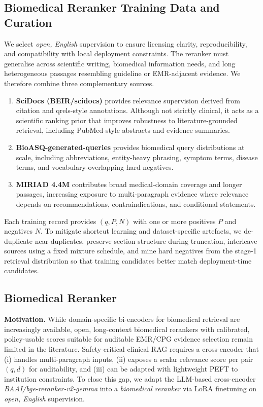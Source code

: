 \documentclass[conference]{IEEEtran}
\begin{document}
\subsection{Biomedical Reranker Training Data and Curation}
\label{app:reranker-data-curation}

We select \emph{open, English} supervision to ensure licensing clarity, reproducibility, and compatibility with local deployment constraints. The reranker must generalise across scientific writing, biomedical information needs, and long heterogeneous passages resembling guideline or EMR-adjacent evidence. We therefore combine three complementary sources.

\begin{enumerate}
    \item \textbf{SciDocs (BEIR/scidocs)} provides relevance supervision derived from citation and qrels-style annotations. Although not strictly clinical, it acts as a scientific ranking prior that improves robustness to literature-grounded retrieval, including PubMed-style abstracts and evidence summaries.
    \item \textbf{BioASQ-generated-queries} provides biomedical query distributions at scale, including abbreviations, entity-heavy phrasing, symptom terms, disease terms, and vocabulary-overlapping hard negatives.
    \item \textbf{MIRIAD 4.4M} contributes broad medical-domain coverage and longer passages, increasing exposure to multi-paragraph evidence where relevance depends on recommendations, contraindications, and conditional statements.
\end{enumerate}

Each training record provides $(q,P,N)$ with one or more positives $P$ and negatives $N$. To mitigate shortcut learning and dataset-specific artefacts, we de-duplicate near-duplicates, preserve section structure during truncation, interleave sources using a fixed mixture schedule, and mine hard negatives from the stage-1 retrieval distribution so that training candidates better match deployment-time candidates.

\subsection{Biomedical Reranker}
\label{subsec:biomedical-reranker}

\textbf{Motivation.}
While domain-specific bi-encoders for biomedical retrieval are increasingly available, open, long-context biomedical rerankers with calibrated, policy-usable scores suitable for auditable EMR/CPG evidence selection remain limited in the literature. Safety-critical clinical RAG requires a cross-encoder that (i) handles multi-paragraph inputs, (ii) exposes a scalar relevance score per pair $(q,d)$ for auditability, and (iii) can be adapted with lightweight PEFT to institution constraints. To close this gap, we adapt the LLM-based cross-encoder \emph{BAAI/bge-reranker-v2-gemma} into a \emph{biomedical reranker} via LoRA finetuning on \emph{open, English} supervision.
\end{document}
